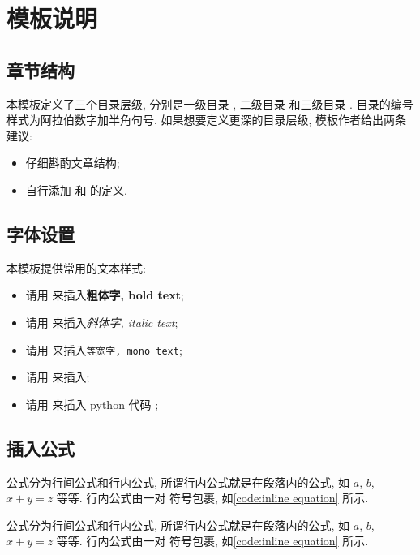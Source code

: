 \documentclass{./template/article}
\begin{document}
\section{模板说明}
\subsection{章节结构}
本模板定义了三个目录层级, 分别是一级目录 \inlinelatex{\section}, 二级目录 \inlinelatex{\subsection} 和三级目录 \inlinelatex{\subsubsection}. 目录的编号样式为阿拉伯数字加半角句号. 如果想要定义更深的目录层级, 模板作者给出两条建议:%
%
\begin{itemize}
  \item 仔细斟酌文章结构;
  \item 自行添加 \inlinelatex{\subsubsubsection} 和 \inlinelatex{\subsubsubsubsection} 的定义.
\end{itemize}

\subsection{字体设置}
本模板提供常用的文本样式:%
%
\begin{itemize}
  \item 请用  来插入\textbf{粗体字, bold text};
  \item 请用  来插入\textit{斜体字, italic text};
  \item 请用  来插入\texttt{等宽字, mono text};
  \item 请用  来插入;
  \item 请用  来插入 python 代码 ;
\end{itemize}

\subsection{插入公式}
公式分为行间公式和行内公式, 所谓行内公式就是在段落内的公式, 如 $a$, $b$, $x + y = z$ 等等. 行内公式由一对 \inlinetext{$} 符号包裹, 如\cref{code:inline equation} 所示.%
%
\begin{latexbox}[
  language = latex,
  caption = 行内公式代码,
  label = code:inline equation
]
公式分为行间公式和行内公式, 所谓行内公式就是在段落内的公式, 如 $a$, $b$, $x + y = z$ 等等. 行内公式由一对 \inlinetext{$} 符号包裹, 如\cref{code:inline equation} 所示.
\end{latexbox}
\end{document}
